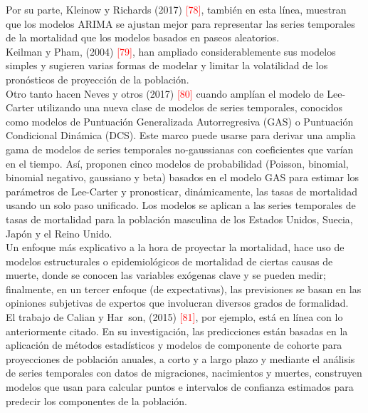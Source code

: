 Por su parte, Kleinow y Richards (2017) \textcolor{red}{[78]}, también en esta línea, muestran que los modelos ARIMA se ajustan mejor para representar las series temporales de la mortalidad que los modelos basados en paseos aleatorios.\\

Keilman y Pham, (2004) \textcolor{red}{[79]}, han ampliado considerablemente sus modelos simples y sugieren varias formas de modelar y limitar la volatilidad de los pronósticos de proyección de la población.\\
 
Otro tanto hacen Neves y otros (2017) \textcolor{red}{[80]} cuando amplían el modelo de Lee-Carter utilizando una nueva clase de modelos de series temporales, conocidos como modelos de Puntuación Generalizada Autorregresiva (GAS) o Puntuación Condicional Dinámica (DCS). Este marco puede usarse para derivar una amplia gama de modelos de series temporales no-gaussianas con coeficientes que varían en el tiempo. Así, proponen cinco modelos de probabilidad (Poisson, binomial, binomial negativo, gaussiano y beta) basados en el modelo GAS para estimar los parámetros de Lee-Carter y pronosticar, dinámicamente, las tasas de mortalidad usando un solo paso unificado. Los modelos se aplican a las series temporales de tasas de mortalidad para la población masculina de los Estados Unidos, Suecia, Japón y el Reino Unido.\\

Un enfoque más explicativo a la hora de proyectar la mortalidad, hace uso de modelos estructurales o epidemiológicos de mortalidad de ciertas causas de muerte, donde se conocen las variables exógenas clave y se pueden medir; finalmente, en un tercer enfoque (de expectativas), las previsiones se basan en las opiniones subjetivas de expertos que involucran diversos grados de formalidad.\\

El trabajo de Calian y Har\dh\ \hspace{-0.12cm}son, (2015) \textcolor{red}{[81]}, por ejemplo, est\'a en l\'inea con lo anteriormente citado. En su investigaci\'on, las predicciones est\'an basadas en la aplicaci\'on de m\'etodos estad\'isticos y modelos de componente de cohorte para proyecciones de poblaci\'on anuales, a corto y a largo plazo y mediante el análisis de series temporales con datos de migraciones, nacimientos y muertes, construyen modelos que usan para calcular puntos e intervalos de confianza estimados para predecir los componentes de la población.\\

